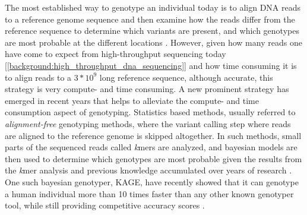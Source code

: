 The most established way to genotype an individual today is to align DNA reads to a reference genome sequence and then examine how the reads differ from the reference sequence to determine which variants are present, and which genotypes are most probable at the different locations \cite{gatk}.
However, given how many reads one have come to expect from high-throughput sequencing today [\ref{background:high_throughput_dna_sequencing}] and how time consuming it is to align reads to a $3*10^9$ long reference sequence, although accurate, this strategy is very compute- and time consuming.
A new prominent strategy has emerged in recent years that helps to alleviate the compute- and time consumption aspect of genotyping.
Statistics based methods, usually referred to \textit{alignment-free} genotyping methods, where the variant calling step where reads are aligned to the reference genome is skipped altogether. 
In such methods, small parts of the sequenced reads called \textit{k}mers are analyzed, and bayesian models are then used to determine which genotypes are most probable given the results from the \textit{k}mer analysis and previous knowledge accumulated over years of research \cite{kage,malva,1000_genomes_project}.
One such bayesian genotyper, KAGE, have recently showed that it can genotype a human individual more than 10 times faster than any other known genotyper tool, while still providing competitive accuracy scores \cite{kage}.

